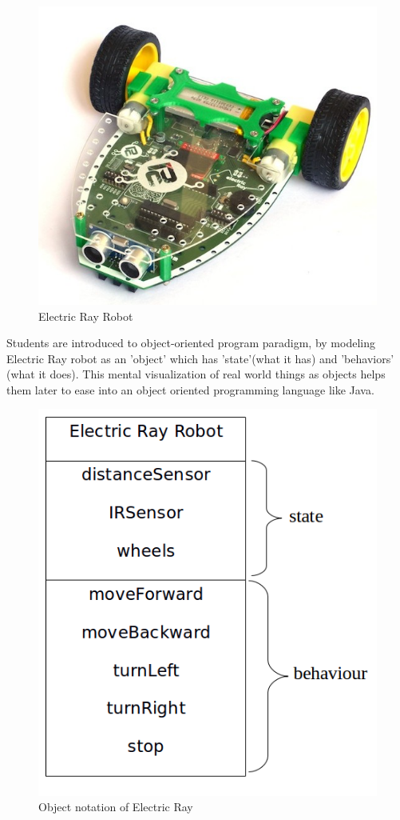 \documentclass[conference]{IEEEtran}
\begin{document}
\begin{figure}[h]
\centering
\includegraphics[scale=0.2]{Fig_05.png}
\caption{Electric Ray Robot}
\end{figure}

Students are introduced to object-oriented program paradigm, by modeling Electric Ray robot as an 'object' which has 'state'(what it has) and 'behaviors' (what it does). This mental visualization of real world things as objects helps them later to ease into an object oriented programming language like Java.

\begin{figure}[h]
\centering
\includegraphics[scale=0.2]{Fig_06.png}
\caption{Object notation of Electric Ray}
\end{figure}
\end{document}
